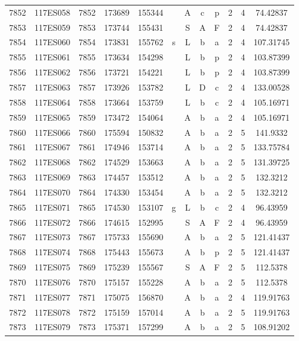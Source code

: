 \begin{tabular}{|*{12}{c|}}
7852 & 117ES058 & 7852 & 173689 & 155344 &  & A & c & p & 2 & 4 & 74.42837 \\ 
7853 & 117ES059 & 7853 & 173744 & 155431 &  & S & A & F & 2 & 4 & 74.42837 \\ 
7854 & 117ES060 & 7854 & 173831 & 155762 & s & L & b & a & 2 & 4 & 107.31745 \\ 
7855 & 117ES061 & 7855 & 173634 & 154298 &  & L & b & p & 2 & 4 & 103.87399 \\ 
7856 & 117ES062 & 7856 & 173721 & 154221 &  & L & b & p & 2 & 4 & 103.87399 \\ 
7857 & 117ES063 & 7857 & 173926 & 153782 &  & L & D & c & 2 & 4 & 133.00528 \\ 
7858 & 117ES064 & 7858 & 173664 & 153759 &  & L & b & c & 2 & 4 & 105.16971 \\ 
7859 & 117ES065 & 7859 & 173472 & 154064 &  & A & b & a & 2 & 4 & 105.16971 \\ 
7860 & 117ES066 & 7860 & 175594 & 150832 &  & A & b & a & 2 & 5 & 141.9332 \\ 
7861 & 117ES067 & 7861 & 174946 & 153714 &  & A & b & a & 2 & 5 & 133.75784 \\ 
7862 & 117ES068 & 7862 & 174529 & 153663 &  & A & b & a & 2 & 5 & 131.39725 \\ 
7863 & 117ES069 & 7863 & 174457 & 153512 &  & A & b & a & 2 & 5 & 132.3212 \\ 
7864 & 117ES070 & 7864 & 174330 & 153454 &  & A & b & a & 2 & 5 & 132.3212 \\ 
7865 & 117ES071 & 7865 & 174530 & 153107 & g & L & b & c & 2 & 4 & 96.43959 \\ 
7866 & 117ES072 & 7866 & 174615 & 152995 &  & S & A & F & 2 & 4 & 96.43959 \\ 
7867 & 117ES073 & 7867 & 175733 & 155690 &  & A & b & a & 2 & 5 & 121.41437 \\ 
7868 & 117ES074 & 7868 & 175443 & 155673 &  & A & b & p & 2 & 5 & 121.41437 \\ 
7869 & 117ES075 & 7869 & 175239 & 155567 &  & S & A & F & 2 & 5 & 112.5378 \\ 
7870 & 117ES076 & 7870 & 175157 & 155228 &  & A & b & a & 2 & 5 & 112.5378 \\ 
7871 & 117ES077 & 7871 & 175075 & 156870 &  & A & b & a & 2 & 4 & 119.91763 \\ 
7872 & 117ES078 & 7872 & 175159 & 157014 &  & A & b & a & 2 & 5 & 119.91763 \\ 
7873 & 117ES079 & 7873 & 175371 & 157299 &  & A & b & a & 2 & 5 & 108.91202 \\ 

\end{tabular}
